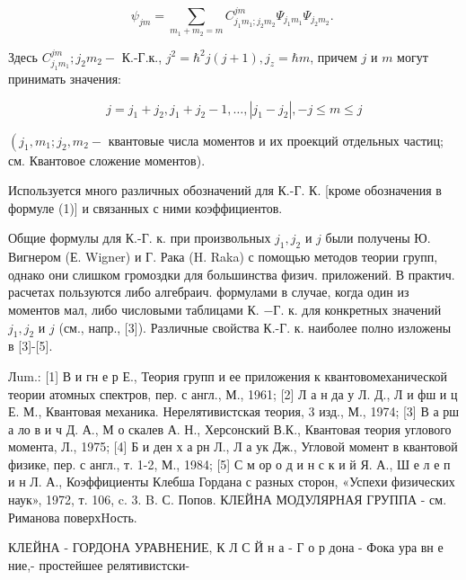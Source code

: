 \documentclass[10pt]{article}
\begin{document}
\[

\psi_{j m}=\sum_{m_{1}+m_{2}=m} C_{j_{1} m_{1} ; j_{2} m_{2}}^{j m} \Psi_{j_{1} m_{1}} \Psi_{j_{2} m_{2}} \text {. }

\]



Здесь $C_{j_{1} m_{1}}^{j m} ; j_{2} m_{2}-$ К.-Г.к., $j^{2}=\hbar^{2} j(j+1), j_{z}=\hbar m$, причем $j$ и $m$ могут принимать значения:



\[

j=j_{1}+j_{2}, j_{1}+j_{2}-1, \ldots,\left|j_{1}-j_{2}\right|,-j \leqslant m \leqslant j

\]



$\left(j_{1}, m_{1} ; j_{2}, m_{2}-\right.$ квантовые числа моментов и их проекций отдельных частиц; см. Квантовое сложение моментов).



Используется много различных обозначений для К.-Г. К. [кроме обозначения в формуле (1)] и связанных с ними коэффициентов.



Общие формулы для К.-Г. к. при произвольных $j_{1}, j_{2}$ и $j$ были получены Ю. Вигнером (Е. Wigner) и Г. Рака (H. Raka) с помощью методов теории групп, однако они слишком громоздки для большинства физич. приложений. В практич. расчетах пользуются либо алгебраич. формулами в случае, когда один из моментов мал, либо числовыми таблицами К. $-Г$. к. для конкретных значений $j_{1}, j_{2}$ и $j$ (см., напр., [3]). Различные свойства К.-Г. к. наиболее полно изложены в [3]-[5].



Лum.: [1] В и гн е р Е., Теория групп и ее приложения к квантовомеханической теории атомных спектров, пер. с англ., М., 1961; [2] Л а н да у Л. Д., Л и фш и ц Е. М., Квантовая механика. Нерелятивистская теория, 3 изд., М., 1974; [3] В а рш а ло в и ч Д. А., М о скалев А. Н., Херсонский В.К., Квантовая теория углового момента, Л., 1975; [4] Б и ден х а рн Л., Л а ук Дж., Угловой момент в квантовой физике, пер. с англ., т. 1-2, М., 1984; [5] С м ор о д и н с к и й Я. А., Ш е л е п и н Л. А., Коэффициенты Клебша Гордана с разных сторон, «Успехи физических наук», 1972, т. 106, c. 3. B. С. Попов. КЛЕЙНА МОДУЛЯРНАЯ ГРУППА - см. Риманова поверхHость.



КЛЕЙНА - ГОРДОНА УРАВНЕНИЕ, К Л С Й н а - Г о р дона - Фока ура вн е ние,- простейшее релятивистски-
\end{document}

